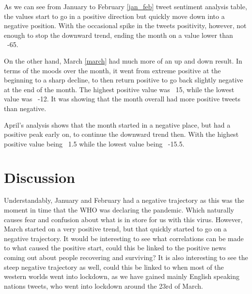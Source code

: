 \documentclass[a4paper,10pt]{article}
\begin{document}
		
		

As we can see from January to February \ref{jan_feb} tweet sentiment analysis table, the values start to go in a positive direction but quickly move down into a negative position. With the occasional spike in the tweets positivity, however, not enough to stop the downward trend, ending the month on a value lower than ~-65. 

On the other hand, March \ref{march} had much more of an up and down result. In terms of the moods over the month, it went from extreme positive at the beginning to a sharp decline, to then return positive to go back slightly negative at the end of the month. The highest positive value was ~15, while the lowest value was ~-12. It was showing that the month overall had more positive tweets than negative.

April's analysis shows that the month started in a negative place, but had a positive peak early on, to continue the downward trend then. With the highest positive value being ~1.5 while the lowest value being ~-15.5.

\section{Discussion}

Understandably, January and February had a negative trajectory as this was the moment in time that the WHO was declaring the pandemic. Which naturally causes fear and confusion about what is in store for us with this virus. However, March started on a very positive trend, but that quickly started to go on a negative trajectory. It would be interesting to see what correlations can be made to what caused the positive start, could this be linked to the positive news coming out about people recovering and surviving? It is also interesting to see the steep negative trajectory as well, could this be linked to when most of the western worlds went into lockdown, as we have gained mainly English speaking nations tweets, who went into lockdown around the 23rd of March.
\end{document}
